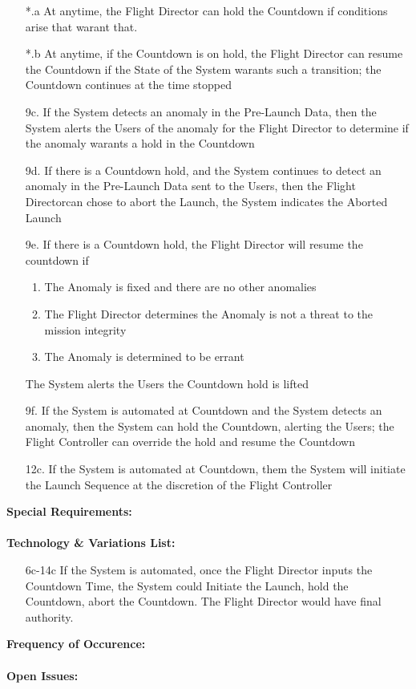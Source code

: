 \documentclass[letterpaper]{article}
\begin{document}
\begin{itemize}
\item[*.a]  At anytime, the Flight Director can hold the Countdown
if conditions arise that warant that.
\item[*.b] At anytime, if the Countdown is on hold, the Flight
Director can resume the Countdown if the State of the System warants
such a transition;  the Countdown continues at the time stopped
\item[9c.]  If the System detects an anomaly in the
Pre-Launch Data, then the System alerts the Users of the anomaly for
the Flight Director to determine if the anomaly warants a hold in the
Countdown
\item[9d.]  If there is a Countdown hold, and the System continues to
detect an anomaly in the Pre-Launch Data sent to the Users, then the
Flight Directorcan chose to abort the Launch, the System indicates the
Aborted Launch
\item[9e.]  If there is a Countdown hold, the Flight Director will
resume the countdown if
\begin{enumerate}
\item The Anomaly is fixed and there are no other anomalies
\item The Flight Director determines the Anomaly is not a threat
to the mission integrity
\item The Anomaly is determined to be errant
\end{enumerate}
The System alerts the Users the Countdown hold is lifted
\item[9f.] If the System is automated at Countdown and the System
detects an anomaly, then the System can hold the Countdown, alerting
the Users;  the Flight Controller can override the hold and resume the
Countdown
\item[12c.] If the System is automated at Countdown, them the System
will initiate the Launch Sequence at the discretion of the Flight
Controller
\end{itemize}
\textbf{Special Requirements: }\\\\
\textbf{Technology \& Variations List: }
\begin{itemize}
\item [6c-14c]If the System is automated, once the Flight Director
inputs the Countdown Time, the System could Initiate the Launch, 
hold the Countdown, abort the Countdown.  The Flight Director would
have final authority.
\end{itemize}
\textbf{Frequency of Occurence:  }\\\\
\textbf{Open Issues:  }
\end{document}

